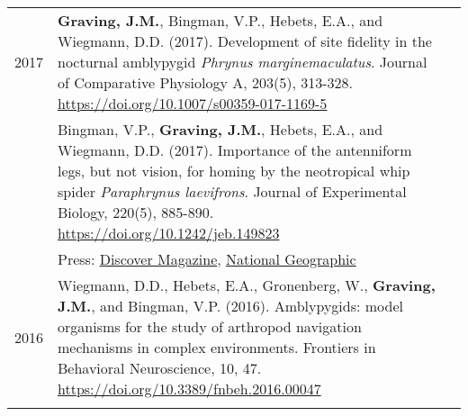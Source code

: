 \documentclass[letterpaper,10pt,oneside]{article}
\begin{document}
\begin{small}
\begin{longtable}{@{} l p{5.3in}l}
\large{2017}
& \textbf{Graving, J.M.}, Bingman, V.P., Hebets, E.A., and Wiegmann, D.D. (2017). Development of site fidelity in the nocturnal amblypygid \textit{Phrynus marginemaculatus}. Journal of Comparative Physiology A, 203(5), 313-328. \href{https://doi.org/10.1007/s00359-017-1169-5}{https://doi.org/10.1007/s00359-017-1169-5} \vspace{1mm} \\
& Bingman, V.P., \textbf{Graving, J.M.}, Hebets, E.A., and Wiegmann, D.D. (2017). Importance of the antenniform legs, but not vision, for homing by the neotropical whip spider \textit{Paraphrynus laevifrons}. Journal of Experimental Biology, 220(5), 885-890.  \href{https://doi.org/10.1242/jeb.149823}{https://doi.org/10.1242/jeb.149823}\\
&Press: \href{http://blogs.discovermagazine.com/inkfish/2017/01/24/whip-spiders-use-their-feet-to-smell-their-way-home}{Discover Magazine}, 
\href{https://www.youtube.com/watch?v=eUoFegXxmfo}{National Geographic} \vspace{1mm} \\

\large{2016}
& Wiegmann, D.D., Hebets, E.A., Gronenberg, W., \textbf{Graving, J.M.}, and Bingman, V.P. (2016). Amblypygids: model organisms for the study of arthropod navigation mechanisms in complex environments. Frontiers in Behavioral Neuroscience, 10, 47. \href{https://doi.org/10.3389/fnbeh.2016.00047}{https://doi.org/10.3389/fnbeh.2016.00047} \vspace{1mm} \\   

 & \\ 


 

\end{longtable}
\end{small}
\end{document}
